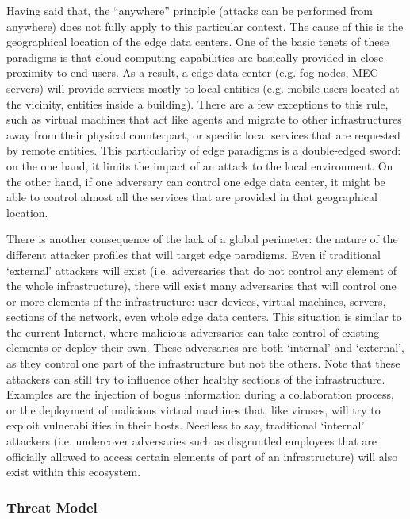 \documentclass[twocolumn,preprint,3p]{elsarticle}
\begin{document}
Having said that, the ``anywhere'' principle (attacks can be performed from anywhere) does not fully apply to this particular context. The cause of this is the geographical location of the edge data centers. One of the basic tenets of these paradigms is that cloud computing capabilities are basically provided in close proximity to end users. As a result, a edge data center (e.g. fog nodes, MEC servers) will provide services mostly to local entities (e.g. mobile users located at the vicinity, entities inside a building). There are a few exceptions to this rule, such as virtual machines that act like agents and migrate to other infrastructures away from their physical counterpart, or specific local services that are requested by remote entities. This particularity of edge paradigms is a double-edged sword: on the one hand, it limits the impact of an attack to the local environment. On the other hand, if one adversary can control one edge data center, it might be able to control almost all the services that are provided in that geographical location.

There is another consequence of the lack of a global perimeter: the nature of the different attacker profiles that will target edge paradigms. Even if traditional `external' attackers will exist (i.e. adversaries that do not control any element of the whole infrastructure), there will exist many adversaries that will control one or more elements of the infrastructure: user devices, virtual machines, servers, sections of the network, even whole edge data centers. This situation is similar to the current Internet, where malicious adversaries can take control of existing elements or deploy their own. These adversaries are both `internal' and `external', as they control one part of the infrastructure but not the others. Note that these attackers can still try to influence other healthy sections of the infrastructure. Examples are the injection of bogus information during a collaboration process, or the deployment of malicious virtual machines that, like viruses, will try to exploit vulnerabilities in their hosts. Needless to say, traditional `internal' attackers (i.e. undercover adversaries such as disgruntled employees that are officially allowed to access certain elements of part of an infrastructure) will also exist within this ecosystem.

\subsubsection{Threat Model}
\label{sec_thre::land::model}
\end{document}
